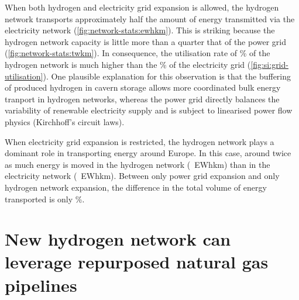 When both hydrogen and electricity grid expansion is allowed, the hydrogen
network transports approximately half the amount of energy transmitted via the
electricity network (\cref{fig:network-stats:ewhkm}). This is striking because
the hydrogen network capacity is little more than a quarter that of the power
grid (\cref{fig:network-stats:twkm}). In consequence, the utilisation rate of
\utilisationHy\% of the hydrogen network is much higher than the
\utilisationAC\% of the electricity grid (\cref{fig:si:grid-utilisation}). One
plausible explanation for this observation is that the buffering of produced
hydrogen in cavern storage allows more coordinated bulk energy tranport in
hydrogen networks, whereas the power grid directly balances the variability of
renewable electricity supply and is subject to linearised power flow physics
(Kirchhoff's circuit laws).

When electricity grid expansion is restricted, the hydrogen network plays a
dominant role in transporting energy around Europe. In this case, around twice
as much energy is moved in the hydrogen network (\ewhkmhydrogen~EWhkm) than in
the electricity network (\ewhkmelectricity~EWhkm). Between only power grid
expansion and only hydrogen network expansion, the difference in the total
volume of energy transported is only \ewhkmdiff\%.

\section*{New hydrogen network can leverage repurposed natural gas pipelines}
\label{sec:repurposed}

